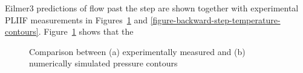 Eilmer3 predictions of flow past the step are shown together with experimental
PLIIF measurements in Figures~\ref{figure-backward-step-pressure-contours} and 
\ref{figure-backward-step-temperature-contours}. 
Figure~\ref{figure-backward-step-pressure-contours} shows that the
%
\begin{figure}[h]
 \centering
 \caption{Comparison between (a) experimentally measured and (b)
          numerically simulated pressure contours}
 \label{figure-backward-step-pressure-contours}
\end{figure}
